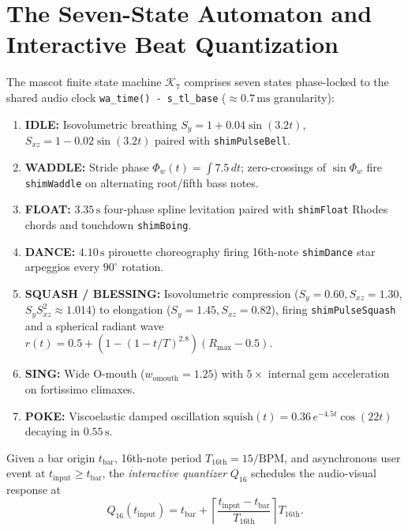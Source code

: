 \section{The Seven-State Automaton and Interactive Beat Quantization}

The mascot finite state machine $\mathcal{K}_7$ comprises seven states phase-locked to the shared audio clock \texttt{wa\_time() - s\_tl\_base} ($\approx 0.7\,\text{ms}$ granularity):
\begin{enumerate}[leftmargin=1.5em]
  \item \textbf{IDLE:} Isovolumetric breathing $S_y = 1 + 0.04\sin(3.2t)$, $S_{xz} = 1 - 0.02\sin(3.2t)$ paired with \texttt{shimPulseBell}.
  \item \textbf{WADDLE:} Stride phase $\Phi_w(t) = \int 7.5\,dt$; zero-crossings of $\sin\Phi_w$ fire \texttt{shimWaddle} on alternating root/fifth bass notes.
  \item \textbf{FLOAT:} $3.35\,\text{s}$ four-phase spline levitation paired with \texttt{shimFloat} Rhodes chords and touchdown \texttt{shimBoing}.
  \item \textbf{DANCE:} $4.10\,\text{s}$ pirouette choreography firing 16th-note \texttt{shimDance} star arpeggios every $90^\circ$ rotation.
  \item \textbf{SQUASH / BLESSING:} Isovolumetric compression ($S_y = 0.60, S_{xz} = 1.30$, $S_y S_{xz}^2 \approx 1.014$) to elongation ($S_y = 1.45, S_{xz} = 0.82$), firing \texttt{shimPulseSquash} and a spherical radiant wave $r(t) = 0.5 + (1 - (1 - t/T)^{2.8})(R_{\max} - 0.5)$.
  \item \textbf{SING:} Wide O-mouth ($w_{\mathrm{omouth}} = 1.25$) with $5\times$ internal gem acceleration on fortissimo climaxes.
  \item \textbf{POKE:} Viscoelastic damped oscillation $\mathrm{squish}(t) = 0.36\,e^{-4.5t}\cos(22t)$ decaying in $0.55\,\text{s}$.
\end{enumerate}

\begin{definition}
Given a bar origin $t_{\mathrm{bar}}$, 16th-note period $T_{\mathrm{16th}} = 15/\mathrm{BPM}$, and asynchronous user event at $t_{\mathrm{input}} \ge t_{\mathrm{bar}}$, the \emph{interactive quantizer} $Q_{16}$ schedules the audio-visual response at
\begin{equation}
\label{eq:quant-16}
Q_{16}(t_{\mathrm{input}}) = t_{\mathrm{bar}} + \left\lceil \frac{t_{\mathrm{input}} - t_{\mathrm{bar}}}{T_{\mathrm{16th}}} \right\rceil T_{\mathrm{16th}}.
\end{equation}
\end{definition}

